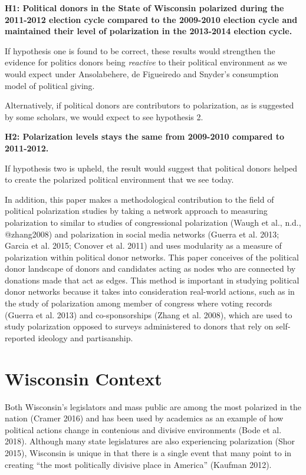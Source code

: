\documentclass[12pt,]{article}
\begin{document}
\textbf{H1: Political donors in the State of Wisconsin polarized during
the 2011-2012 election cycle compared to the 2009-2010 election cycle
and maintained their level of polarization in the 2013-2014 election
cycle.}

If hypothesis one is found to be correct, these results would strengthen
the evidence for politics donors being \emph{reactive} to their
political environment as we would expect under Ansolabehere, de
Figueiredo and Snyder's consumption model of political giving.

Alternatively, if political donors are contributors to polarization, as
is suggested by some scholars, we would expect to see hypothesis 2.

\textbf{H2: Polarization levels stays the same from 2009-2010 compared
to 2011-2012.}

If hypothesis two is upheld, the result would suggest that political
donors helped to create the polarized political environment that we see
today.

In addition, this paper makes a methodological contribution to the field
of political polarization studies by taking a network approach to
measuring polarization to similar to studies of congressional
polarization (Waugh et al., n.d., @zhang2008) and polarization in social
media networks (Guerra et al. 2013; Garcia et al. 2015; Conover et al.
2011) and uses modularity as a measure of polarization within political
donor networks. This paper conceives of the political donor landscape of
donors and candidates acting as nodes who are connected by donations
made that act as edges. This method is important in studying political
donor networks because it takes into consideration real-world actions,
such as in the study of polarization among member of congress where
voting records (Guerra et al. 2013) and co-sponsorships (Zhang et al.
2008), which are used to study polarization opposed to surveys
administered to donors that rely on self-reported ideology and
partisanship.

\hypertarget{wisconsin-context}{%
\section{Wisconsin Context}\label{wisconsin-context}}

Both Wisconsin's legislators and mass public are among the most
polarized in the nation (Cramer 2016) and has been used by academics as
an example of how political actions change in contenious and divisive
environments (Bode et al. 2018). Although many state legislatures are
also experiencing polarization (Shor 2015), Wisconsin is unique in that
there is a single event that many point to in creating ``the most
politically divisive place in America'' (Kaufman 2012).
\end{document}
